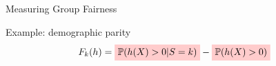 \documentclass[17pt,aspectratio=169]{beamer}
\begin{document}
\begin{frame}{Measuring Group Fairness}

  \vspace{-0.5em}
  Example: demographic parity
  \begin{align*}
    F_k(h)
    & =
      \tikz[baseline,remember picture]{\node[fill=red!20,anchor=base]
      (shirtprob){$\displaystyle \prob( h(X) > 0 | S = k)$};}
      -
      \tikz[baseline,remember picture]{\node[fill=red!20,anchor=base]
      (baseprob){$\displaystyle \prob( h(X) > 0 ) $};}
  \end{align*}

  \vspace{1.5em}

  \qquad\qquad\qquad\qquad\qquad\qquad\qquad\qquad\qquad\quad

  \vspace{2em}


  \vspace{1.5em}
\end{frame}
\end{document}
